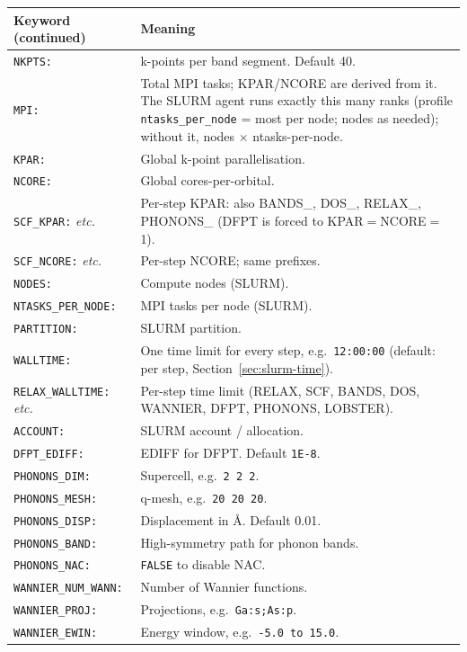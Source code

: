 \documentclass[11pt,a4paper]{scrartcl}
\newcommand{\thead}{\rowcolor{lightblue}}
\begin{document}
\begin{tabularx}{\linewidth}{@{}lX@{}}
\thead
Keyword (continued) & Meaning \\ \midrule
\texttt{NKPTS:} & k-points per band segment. Default 40. \\
\texttt{MPI:} & Total MPI tasks; KPAR/NCORE are derived from it. The SLURM agent runs exactly this many ranks (profile \texttt{ntasks\_per\_node} = most per node; nodes as needed); without it, nodes $\times$ ntasks-per-node. \\
\texttt{KPAR:} & Global k-point parallelisation. \\
\texttt{NCORE:} & Global cores-per-orbital. \\
\texttt{SCF\_KPAR:} \textit{etc.} &
  Per-step KPAR: also BANDS\_, DOS\_, RELAX\_, PHONONS\_
  (DFPT is forced to KPAR${}={}$NCORE${}={}$1). \\
\texttt{SCF\_NCORE:} \textit{etc.} & Per-step NCORE; same prefixes. \\
\texttt{NODES:} & Compute nodes (SLURM). \\
\texttt{NTASKS\_PER\_NODE:} & MPI tasks per node (SLURM). \\
\texttt{PARTITION:} & SLURM partition. \\
\texttt{WALLTIME:} & One time limit for every step, e.g.\ \texttt{12:00:00}
  (default: per step, Section~\ref{sec:slurm-time}). \\
\texttt{RELAX\_WALLTIME:} \textit{etc.} & Per-step time limit (RELAX, SCF,
  BANDS, DOS, WANNIER, DFPT, PHONONS, LOBSTER). \\
\texttt{ACCOUNT:} & SLURM account / allocation. \\
\texttt{DFPT\_EDIFF:} & EDIFF for DFPT. Default \texttt{1E-8}. \\
\texttt{PHONONS\_DIM:} & Supercell, e.g.\ \texttt{2 2 2}. \\
\texttt{PHONONS\_MESH:} & q-mesh, e.g.\ \texttt{20 20 20}. \\
\texttt{PHONONS\_DISP:} & Displacement in \AA. Default 0.01. \\
\texttt{PHONONS\_BAND:} & High-symmetry path for phonon bands. \\
\texttt{PHONONS\_NAC:} & \texttt{FALSE} to disable NAC. \\
\texttt{WANNIER\_NUM\_WANN:} & Number of Wannier functions. \\
\texttt{WANNIER\_PROJ:} & Projections, e.g.\ \texttt{Ga:s;As:p}. \\
\texttt{WANNIER\_EWIN:} & Energy window, e.g.\ \texttt{-5.0 to 15.0}. \\

\end{tabularx}
\end{document}
